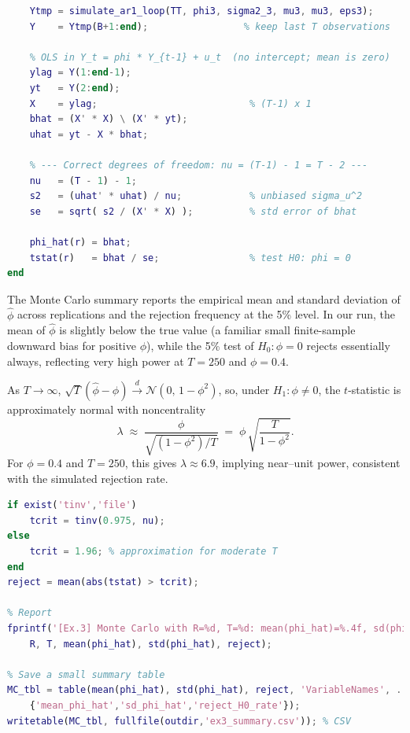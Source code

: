 \documentclass[dvipsnames,11pt]{article}
\begin{document}
\begin{solution}
\begin{lstlisting}[language=Matlab]
    % Start at the mean (mu3) + burn-in
    Ytmp = simulate_ar1_loop(TT, phi3, sigma2_3, mu3, mu3, eps3);
    Y    = Ytmp(B+1:end);                 % keep last T observations

    % OLS in Y_t = phi * Y_{t-1} + u_t  (no intercept; mean is zero)
    ylag = Y(1:end-1);
    yt   = Y(2:end);
    X    = ylag;                           % (T-1) x 1
    bhat = (X' * X) \ (X' * yt);
    uhat = yt - X * bhat;

    % --- Correct degrees of freedom: nu = (T-1) - 1 = T - 2 ---
    nu   = (T - 1) - 1;
    s2   = (uhat' * uhat) / nu;            % unbiased sigma_u^2
    se   = sqrt( s2 / (X' * X) );          % std error of bhat

    phi_hat(r) = bhat;
    tstat(r)   = bhat / se;                % test H0: phi = 0
end
\end{lstlisting}

        The Monte Carlo summary reports the empirical mean and standard deviation of $\widehat\phi$ across replications and the rejection frequency at the 5\% level. In our run, the mean of $\widehat\phi$ is slightly below the true value (a familiar small finite-sample downward bias for positive $\phi$), while the 5\% test of $H_0\!:\phi=0$ rejects essentially always, reflecting very high power at $T=250$ and $\phi=0.4$.

        \begin{remark}
            As $T\to\infty$, $\sqrt{T}(\widehat\phi-\phi)\overset{d}{\to}\mathcal{N}\!\left(0,\,1-\phi^2\right)$, so, under $H_1\!:\phi\neq0$, the $t$-statistic is approximately normal with noncentrality
            \[
              \lambda \;\approx\; \frac{\phi}{\sqrt{(1-\phi^2)/T}}
              \;=\; \phi\,\sqrt{\frac{T}{1-\phi^2}}.
            \]
            For $\phi=0.4$ and $T=250$, this gives $\lambda\approx 6.9$, implying near–unit power, consistent with the simulated rejection rate.
        \end{remark}

\begin{lstlisting}[language=Matlab]
% Rejection frequency at 5%
if exist('tinv','file')
    tcrit = tinv(0.975, nu);
else
    tcrit = 1.96; % approximation for moderate T
end
reject = mean(abs(tstat) > tcrit);

% Report
fprintf('[Ex.3] Monte Carlo with R=%d, T=%d: mean(phi_hat)=%.4f, sd(phi_hat)=%.4f, reject H0 at 5%% = %.3f\n', ...
    R, T, mean(phi_hat), std(phi_hat), reject);

% Save a small summary table
MC_tbl = table(mean(phi_hat), std(phi_hat), reject, 'VariableNames', ...
    {'mean_phi_hat','sd_phi_hat','reject_H0_rate'});
writetable(MC_tbl, fullfile(outdir,'ex3_summary.csv')); % CSV
\end{lstlisting}


\end{solution}
\end{document}
